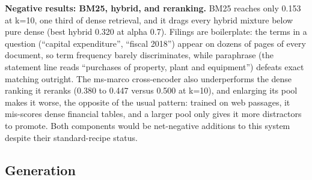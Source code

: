 \documentclass[
  11pt,
]{article}
\begin{document}
\textbf{Negative results: BM25, hybrid, and reranking.} BM25 reaches
only 0.153 at k=10, one third of dense retrieval, and it drags every
hybrid mixture below pure dense (best hybrid 0.320 at alpha 0.7).
Filings are boilerplate: the terms in a question (``capital
expenditure'', ``fiscal 2018'') appear on dozens of pages of every
document, so term frequency barely discriminates, while paraphrase (the
statement line reads ``purchases of property, plant and equipment'')
defeats exact matching outright. The ms-marco cross-encoder also
underperforms the dense ranking it reranks (0.380 to 0.447 versus 0.500
at k=10), and enlarging its pool makes it worse, the opposite of the
usual pattern: trained on web passages, it mis-scores dense financial
tables, and a larger pool only gives it more distractors to promote.
Both components would be net-negative additions to this system despite
their standard-recipe status.

\subsection{Generation}\label{generation-1}
\end{document}
